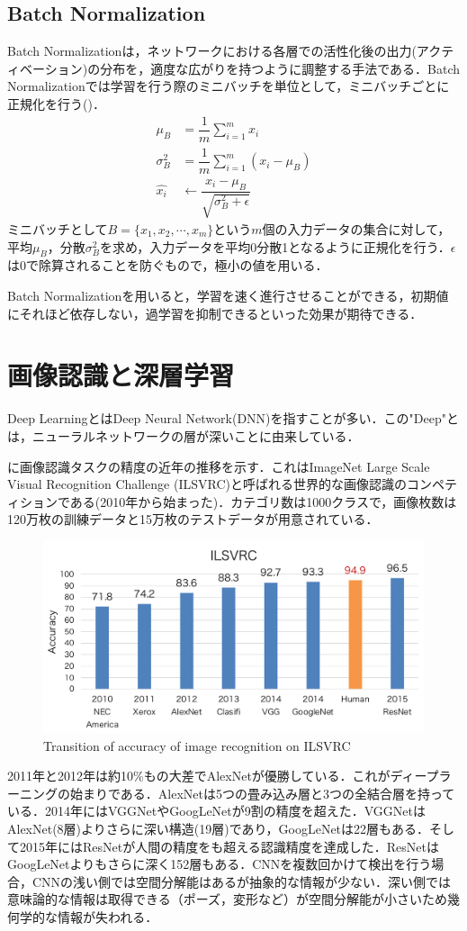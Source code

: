 \subsection*{Batch Normalization}
Batch Normalization\cite{BatchNorm}は，ネットワークにおける各層での活性化後の出力(アクティベーション)の分布を，適度な広がりを持つように調整する手法である．Batch Normalizationでは学習を行う際のミニバッチを単位として，ミニバッチごとに正規化を行う()．
\begin{align}\label{eq:BatchNorm}
	\mu_B & = \dfrac{1}{m}\sum_{i=1}^m x_i \\
	\sigma_B^2 & = \dfrac{1}{m}\sum_{i=1}^m (x_i - \mu_B) \\
	\hat{x_i} & \leftarrow \dfrac{x_i - \mu_B}{\sqrt{\sigma_B^2 + \epsilon}}
\end{align}
ミニバッチとして$B = \{x_1, x_2, \cdots, x_m\}$という$m$個の入力データの集合に対して，平均$\mu_B$，分散$\sigma_B^2$を求め，入力データを平均0分散1となるように正規化を行う．$\epsilon$は0で除算されることを防ぐもので，極小の値を用いる．

Batch Normalizationを用いると，学習を速く進行させることができる，初期値にそれほど依存しない，過学習を抑制できるといった効果が期待できる．


\section{画像認識と深層学習}
Deep LearningとはDeep Neural Network(DNN)を指すことが多い．この"Deep"とは，ニューラルネットワークの層が深いことに由来している．

に画像認識タスクの精度の近年の推移を示す．これはImageNet Large Scale Visual Recognition Challenge (ILSVRC)と呼ばれる世界的な画像認識のコンペティションである(2010年から始まった)．カテゴリ数は1000クラスで，画像枚数は120万枚の訓練データと15万枚のテストデータが用意されている．
\begin{figure}[H]
	\centering
	\includegraphics[width=0.7\linewidth]{figure/chapter2/ILSVRC}
	\caption{Transition of accuracy of image recognition on ILSVRC}
	\label{fig:ImageNet}
\end{figure}
2011年と2012年は約10\%もの大差でAlexNet\cite{AlexNet}が優勝している．これがディープラーニングの始まりである．AlexNetは5つの畳み込み層と3つの全結合層を持っている．2014年にはVGGNet\cite{VGGNet}やGoogLeNet\cite{GoogLeNet}が9割の精度を超えた．VGGNetはAlexNet(8層)よりさらに深い構造(19層)であり，GoogLeNetは22層もある．そして2015年にはResNet\cite{ResNet}が人間の精度をも超える認識精度を達成した．ResNetはGoogLeNetよりもさらに深く152層もある．CNNを複数回かけて検出を行う場合，CNNの浅い側では空間分解能はあるが抽象的な情報が少ない．深い側では意味論的な情報は取得できる（ポーズ，変形など）が空間分解能が小さいため幾何学的な情報が失われる．

